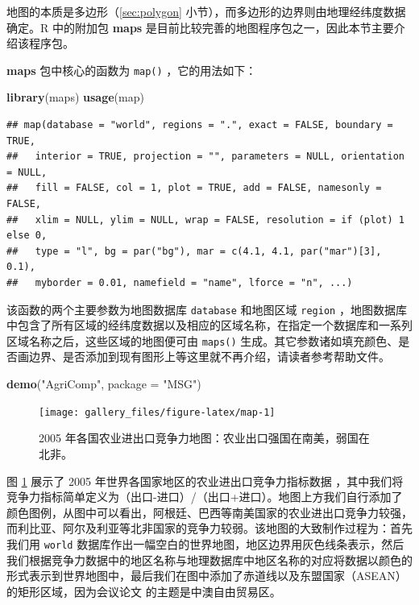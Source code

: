 \documentclass[
  b5paper,
  UTF8,twoside]{book}
\newenvironment{Shaded}{\begin{snugshade}}{\end{snugshade}}
\newcommand{\AttributeTok}[1]{\textcolor[rgb]{0.13,0.29,0.53}{#1}}
\newcommand{\FunctionTok}[1]{\textcolor[rgb]{0.13,0.29,0.53}{\textbf{#1}}}
\newcommand{\NormalTok}[1]{#1}
\newcommand{\StringTok}[1]{\textcolor[rgb]{0.31,0.60,0.02}{#1}}
\begin{document}
地图的本质是多边形（\ref{sec:polygon} 小节），而多边形的边界则由地理经纬度数据确定。R 中的附加包 \textbf{maps} \citep{maps} 是目前比较完善的地图程序包之一，因此本节主要介绍该程序包。

\textbf{maps} 包中核心的函数为 \texttt{map()} ，它的用法如下：

\begin{Shaded}
\begin{Highlighting}[]
\FunctionTok{library}\NormalTok{(maps)}
\FunctionTok{usage}\NormalTok{(map)}
\end{Highlighting}
\end{Shaded}

\begin{verbatim}
## map(database = "world", regions = ".", exact = FALSE, boundary = TRUE,
##   interior = TRUE, projection = "", parameters = NULL, orientation = NULL,
##   fill = FALSE, col = 1, plot = TRUE, add = FALSE, namesonly = FALSE,
##   xlim = NULL, ylim = NULL, wrap = FALSE, resolution = if (plot) 1 else 0,
##   type = "l", bg = par("bg"), mar = c(4.1, 4.1, par("mar")[3], 0.1),
##   myborder = 0.01, namefield = "name", lforce = "n", ...)
\end{verbatim}

该函数的两个主要参数为地图数据库 \texttt{database} 和地图区域 \texttt{region} ，地图数据库中包含了所有区域的经纬度数据以及相应的区域名称，在指定一个数据库和一系列区域名称之后，这些区域的地图便可由 \texttt{maps()} 生成。其它参数诸如填充颜色、是否画边界、是否添加到现有图形上等这里就不再介绍，请读者参考帮助文件。





\begin{Shaded}
\begin{Highlighting}[]
\FunctionTok{demo}\NormalTok{(}\StringTok{"AgriComp"}\NormalTok{, }\AttributeTok{package =} \StringTok{"MSG"}\NormalTok{)}
\end{Highlighting}
\end{Shaded}

\begin{figure}

{\centering \texttt{[image: gallery\_files/figure-latex/map-1]} 

}

\caption[2005 年世界各国农业进出口竞争力地图]{2005 年各国农业进出口竞争力地图：农业出口强国在南美，弱国在北非。}\label{fig:map}
\end{figure}

图 \ref{fig:map}
展示了 2005 年世界各国家地区的农业进出口竞争力指标数据 \citep{Xie07}，其中我们将竞争力指标简单定义为（出口-进口）/（出口+进口）。地图上方我们自行添加了颜色图例，从图中可以看出，阿根廷、巴西等南美国家的农业进出口竞争力较强，而利比亚、阿尔及利亚等北非国家的竞争力较弱。该地图的大致制作过程为：首先我们用 \texttt{world} 数据库作出一幅空白的世界地图，地区边界用灰色线条表示，然后我们根据竞争力数据中的地区名称与地理数据库中地区名称的对应将数据以颜色的形式表示到世界地图中，最后我们在图中添加了赤道线以及东盟国家（ASEAN）的矩形区域，因为会议论文 \citet{Xie07} 的主题是中澳自由贸易区。
\end{document}
